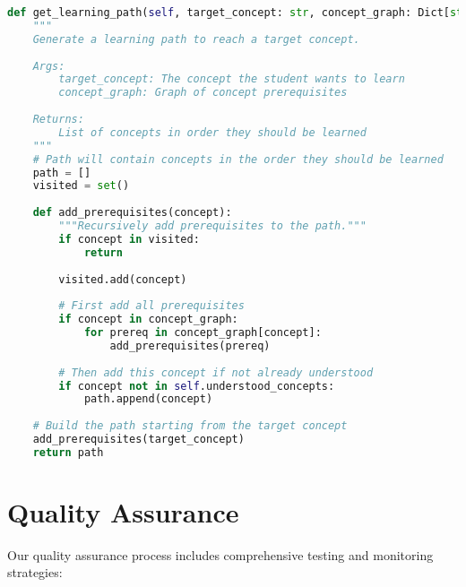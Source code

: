 \begin{lstlisting}[language=Python, caption=Learning Path Generation, label=lst:learning-path]
def get_learning_path(self, target_concept: str, concept_graph: Dict[str, List[str]]) -> List[str]:
    """
    Generate a learning path to reach a target concept.
    
    Args:
        target_concept: The concept the student wants to learn
        concept_graph: Graph of concept prerequisites
        
    Returns:
        List of concepts in order they should be learned
    """
    # Path will contain concepts in the order they should be learned
    path = []
    visited = set()
    
    def add_prerequisites(concept):
        """Recursively add prerequisites to the path."""
        if concept in visited:
            return
        
        visited.add(concept)
        
        # First add all prerequisites
        if concept in concept_graph:
            for prereq in concept_graph[concept]:
                add_prerequisites(prereq)
        
        # Then add this concept if not already understood
        if concept not in self.understood_concepts:
            path.append(concept)
    
    # Build the path starting from the target concept
    add_prerequisites(target_concept)
    return path
\end{lstlisting}

\section{Quality Assurance}
\label{sec:qa}

Our quality assurance process includes comprehensive testing and monitoring strategies:

